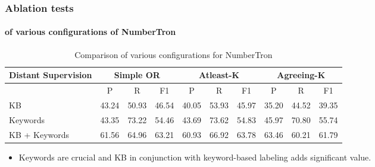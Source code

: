 \documentclass{beamer}
\begin{document}
\begin{frame}
\frametitle{Ablation tests}
\framesubtitle{of various configurations of NumberTron}

\begin{table}
\begin{adjustbox}{max width=\textwidth}
\begin{tabular}{|l|ccc|ccc|ccc|}
\hline
\textbf{Distant Supervision} &  \multicolumn{3}{|c|}{\textbf{Simple OR}} &  \multicolumn{3}{|c|}{\textbf{Atleast-K}} & \multicolumn{3}{|c|}{\textbf{Agreeing-K}} \\
\hline
	    & P & R & F1 & P & R & F1 & P & R & F1\\
\hline 
\hline

KB & 43.24 & 50.93 & 46.54 & 40.05 & 53.93 & 45.97 & 35.20 & 44.52 &  39.35\\
\hline
Keywords & 43.35 & 73.22 & 54.46 & 43.69 & 73.62 & 54.83 & 45.97 & 70.80 & 55.74 \\
\hline
KB + Keywords & 61.56 & 64.96 & 63.21 & 60.93 & 66.92 & 63.78 & 63.46 & 60.21 & 61.79\\
\hline

\end{tabular}
\end{adjustbox}
\caption{Comparison of various configurations for NumberTron}
\label{table:numbertronconfigs}
\end{table}

\begin{itemize}
\item Keywords are crucial and KB in conjunction with keyword-based labeling adds significant value.
\end{itemize}

\end{frame}

\end{document}
